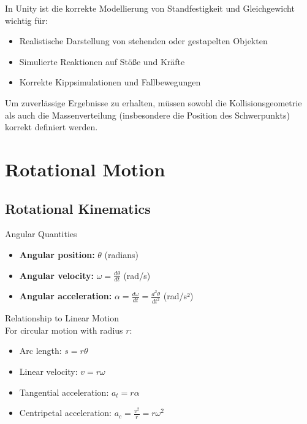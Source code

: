 \begin{remark}
    In Unity ist die korrekte Modellierung von Standfestigkeit und Gleichgewicht wichtig für:
    \begin{itemize}
        \item Realistische Darstellung von stehenden oder gestapelten Objekten
        \item Simulierte Reaktionen auf Stöße und Kräfte
        \item Korrekte Kippsimulationen und Fallbewegungen
    \end{itemize}
    
    Um zuverlässige Ergebnisse zu erhalten, müssen sowohl die Kollisionsgeometrie als auch die Massenverteilung (insbesondere die Position des Schwerpunkts) korrekt definiert werden.
\end{remark}

\section{Rotational Motion}

\subsection{Rotational Kinematics}

\begin{definition}{Angular Quantities}
    \begin{itemize}
        \item \textbf{Angular position:} $\theta$ (radians)
        \item \textbf{Angular velocity:} $\omega = \frac{d\theta}{dt}$ (rad/s)
        \item \textbf{Angular acceleration:} $\alpha = \frac{d\omega}{dt} = \frac{d^2\theta}{dt^2}$ (rad/s²)
    \end{itemize}
\end{definition}

\begin{concept}{Relationship to Linear Motion}\\
    For circular motion with radius $r$:
    \begin{itemize}
        \item Arc length: $s = r\theta$
        \item Linear velocity: $v = r\omega$
        \item Tangential acceleration: $a_t = r\alpha$
        \item Centripetal acceleration: $a_c = \frac{v^2}{r} = r\omega^2$
    \end{itemize}
\end{concept}

